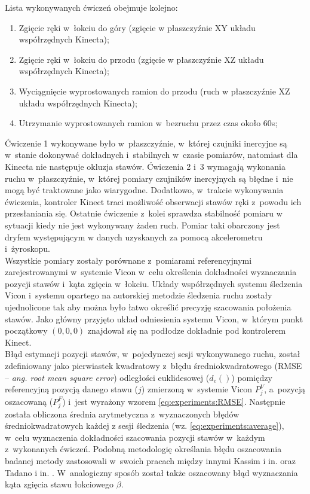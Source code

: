 Lista wykonywanych ćwiczeń obejmuje kolejno:
\begin{enumerate}
	\item Zgięcie ręki w~łokciu do góry (zgięcie w płaszczyźnie XY układu współrzędnych Kinecta); \\
	\item Zgięcie ręki w~łokciu do przodu (zgięcie w płaszczyźnie XZ układu współrzędnych Kinecta); \\
	\item Wyciągnięcie wyprostowanych ramion do przodu (ruch w płaszczyźnie XZ układu współrzędnych Kinecta); \\
	\item Utrzymanie wyprostowanych ramion w~bezruchu przez czas około 60s; \\
\end{enumerate}
						
Ćwiczenie 1 wykonywane było w~płaszczyźnie, w~której czujniki inercyjne są w~stanie dokonywać dokładnych i~stabilnych w~czasie pomiarów, natomiast dla Kinecta nie następuje okluzja stawów. Ćwiczenia 2 i~3 wymagają wykonania ruchu w~płaszczyźnie, w~której pomiary czujników inercyjnych są błędne i~nie mogą być traktowane jako wiarygodne. Dodatkowo, w~trakcie wykonywania ćwiczenia, kontroler Kinect traci możliwość obserwacji stawów ręki z~powodu ich przesłaniania się. Ostatnie ćwiczenie z~kolei sprawdza stabilność pomiaru w sytuacji kiedy nie jest wykonywany żaden ruch. Pomiar taki obarczony jest dryfem występującym w danych uzyskanych za pomocą akcelerometru i~żyroskopu.\\
						
Wszystkie pomiary zostały porównane z~pomiarami referencyjnymi zarejestrowanymi w~systemie Vicon w~celu określenia dokładności wyznaczania pozycji stawów i~kąta zgięcia w~łokciu. Układy współrzędnych systemu śledzenia Vicon i~systemu opartego na autorskiej metodzie śledzenia ruchu zostały ujednolicone tak aby można było łatwo określić precyzję szacowania położenia stawów. Jako główny przyjęto układ odniesienia systemu Vicon, w~którym punkt początkowy $(0,0,0)$ znajdował się na podłodze dokładnie pod kontrolerem Kinect.\\
						
Błąd estymacji pozycji stawów, w~pojedynczej sesji wykonywanego ruchu, został zdefiniowany jako pierwiastek kwadratowy z~błędu średniokwadratowego (RMSE -- \emph{ang. root mean square error}) odległości euklidesowej ($d_e()$) pomiędzy referencyjną pozycją danego stawu ($j$) zmierzoną w~systemie Vicon $P^V_j$, a~pozycją oszacowaną ($P^F_j$) i~jest wyrażony wzorem \ref{eq:experiments:RMSE}. Następnie została obliczona średnia arytmetyczna z~wyznaczonych błędów średniokwadratowych każdej z sesji śledzenia (wz. \ref{eq:experiments:average}), w~celu wyznaczenia dokładności szacowania pozycji stawów w~każdym z~wykonanych ćwiczeń. Podobną metodologię określania błędu oszacowania badanej metody zastosowali w~swoich pracach między innymi Kassim i in. \cite{Kassim2008} oraz Tadano i in. \cite{Tadano2013}. W~analogiczny sposób został także oszacowany błąd wyznaczania kąta zgięcia stawu łokciowego $\beta$.
						
